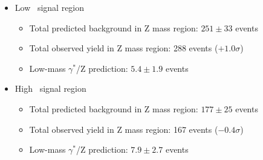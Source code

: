 \begin{itemize}
\item Low \MET\ signal region
\begin{itemize}
  \item Total predicted background in Z mass region: $251\pm33$ events
  \item Total observed yield in Z mass region: 288 events ($+1.0\sigma$)
  \item Low-mass $\gamma^*$/Z prediction: $5.4\pm1.9$ events
\end{itemize}
\item High \MET\ signal region
\begin{itemize}
  \item Total predicted background in Z mass region: $177\pm25$ events
  \item Total observed yield in Z mass region: 167 events ($-0.4\sigma$)
  \item Low-mass $\gamma^*$/Z prediction: $7.9\pm2.7$ events
\end{itemize}
\end{itemize}


